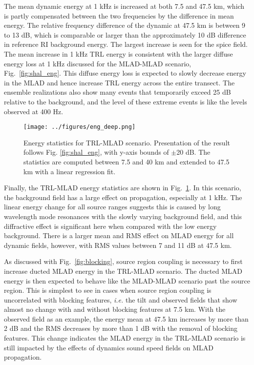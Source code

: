 \documentclass[preprint,NumberedRefs]{JASA}
\begin{document}
The mean dynamic energy at 1 kHz is increased at both 7.5 and 47.5 km, which is partly compensated between the two frequencies by the difference in mean energy. The relative frequency difference of the dynamic at 47.5 km is between 9 to 13 dB, which is comparable or larger than the approximately 10 dB difference in reference RI background energy. The largest increase is seen for the spice field. The mean increase in 1 kHz TRL energy is consistent with the larger diffuse energy loss at 1 kHz discussed for the MLAD-MLAD scenario, Fig.~\ref{fig:shal_eng}. This diffuse energy loss is expected to slowly decrease energy in the MLAD and hence increase TRL energy across the entire transect. The ensemble realizations also show many events that temporarily exceed 25 dB relative to the background, and the level of these extreme events is like the levels observed at 400 Hz.

\begin{figure}
\texttt{[image: ../figures/eng\_deep.png]}
    \caption{Energy statistics for TRL-MLAD scenario. Presentation of the result follows Fig. \ref{fig:shal_eng}, with y-axis bounds of $\pm$20 dB. The statistics are computed between 7.5 and 40 km and extended to 47.5 km with a linear regression fit.}
    \label{fig:deep_eng}
\end{figure}
Finally, the TRL-MLAD energy statistics are shown in Fig.~\ref{fig:deep_eng}. In this scenario, the background field has a large effect on propagation, especially at 1 kHz. The linear energy change for all source ranges suggests this is caused by long wavelength mode resonances with the slowly varying background field\cite{colosi21}, and this diffractive effect is significant here when compared with the low energy background. There is a larger mean and RMS effect on MLAD energy for all dynamic fields, however, with RMS values between 7 and 11 dB at 47.5 km.

As discussed with Fig.~\ref{fig:blocking}, source region coupling is necessary to first increase ducted MLAD energy in the TRL-MLAD scenario. The ducted MLAD energy is then expected to behave like the MLAD-MLAD scenario past the source region. This is simplest to see in cases when source region coupling is uncorrelated with blocking features, \emph{i.e.} the tilt and observed fields that show almost no change with and without blocking features at 7.5 km. With the observed field as an example, the energy mean at 47.5 km increases by more than 2 dB and the RMS decreases by more than 1 dB with the removal of blocking features. This change indicates the MLAD energy in the TRL-MLAD scenario is still impacted by the effects of dynamics sound speed fields on MLAD propagation.
\end{document}
